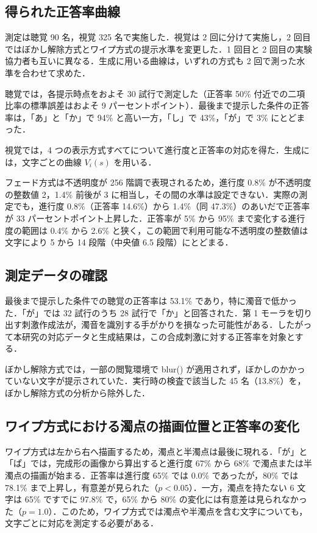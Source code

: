 \subsection{得られた正答率曲線}

測定は聴覚 90 名，視覚 325 名で実施した．視覚は 2 回に分けて実施し，2 回目ではぼかし解除方式とワイプ方式の提示水準を変更した．1 回目と 2 回目の実験協力者も互いに異なる．生成に用いる曲線は，いずれの方式も 2 回で測った水準を合わせて求めた．

聴覚では，各提示時点をおよそ 30 試行で測定した（正答率 50\% 付近での二項比率の標準誤差はおよそ 9 パーセントポイント）．最後まで提示した条件の正答率は，「あ」と「か」で 94\% と高い一方，「し」で 43\%，「が」で 3\% にとどまった．

視覚では，4 つの表示方式すべてについて進行度と正答率の対応を得た．生成には，文字ごとの曲線 $V_i(s)$ を用いる．

フェード方式は不透明度が 256 階調で表現されるため，進行度 0.8\% が不透明度の整数値 2，1.4\% 前後が 3 に相当し，その間の水準は設定できない．実際の測定でも，進行度 0.8\%（正答率 14.6\%）から 1.4\%（同 47.3\%）のあいだで正答率が 33 パーセントポイント上昇した．正答率が 5\% から 95\% まで変化する進行度の範囲は 0.4\% から 2.6\% と狭く，この範囲で利用可能な不透明度の整数値は文字により 5 から 14 段階（中央値 6.5 段階）にとどまる．


\subsection{測定データの確認}

最後まで提示した条件での聴覚の正答率は 53.1\% であり，特に濁音で低かった．「が」では 32 試行のうち 28 試行で「か」と回答された．第 1 モーラを切り出す刺激作成法が，濁音を識別する手がかりを損なった可能性がある．したがって本研究の対応データと生成結果は，この合成刺激に対する正答率を対象とする．

ぼかし解除方式では，一部の閲覧環境で blur() が適用されず，ぼかしのかかっていない文字が提示されていた．実行時の検査で該当した 45 名（13.8\%）を，ぼかし解除方式の分析から除外した．


\subsection{ワイプ方式における濁点の描画位置と正答率の変化}

ワイプ方式は左から右へ描画するため，濁点と半濁点は最後に現れる．「が」と「ぱ」では，完成形の画像から算出すると進行度 67\% から 68\% で濁点または半濁点の描画が始まる．正答率は進行度 65\% では 0.0\% であったが，80\% では 78.1\% まで上昇し，有意差が見られた（$p < 0.05$）．一方，濁点を持たない 6 文字は 65\% ですでに 97.8\% で，65\% から 80\% の変化には有意差は見られなかった（$p = 1.0$）．このため，ワイプ方式では濁点や半濁点を含む文字についても，文字ごとに対応を測定する必要がある．


